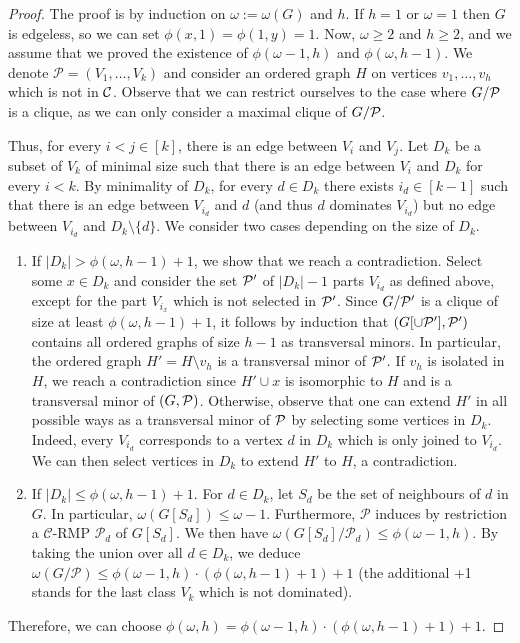 \documentclass[11pt]{article}
\numberwithin{equation}{section}
\begin{document}
\begin{proof}
    The proof is by induction on $\omega :=\omega(G)$ and $h$. 
    If $h=1$ or $\omega =1$ then $G$ is edgeless, so we can set $\phi(x,1)=\phi(1,y)=1$. 
    Now, $\omega \geq 2$ and $h \geq 2$, and we assume that we proved the existence of $\phi(\omega - 1, h)$ and $\phi(\omega, h-1)$.
    We denote $\mathcal{P} = (V_1, \ldots, V_k)$ and consider an ordered graph $H$ on vertices $v_1,\dots ,v_h$ which is not in $\cal C$. Observe that we can restrict ourselves to the case where $G/{\cal P}$ is a clique, as we can only consider a maximal clique of $G/{\cal P}$.
    
    Thus, for every $i < j \in [k]$, there is an edge between $V_i$ and $V_j$.
    Let $D_k$ be a subset of $V_k$ of minimal size such that there is an edge between $V_i$ and $D_k$ for every $i < k$. By minimality of $D_k$, for every $d \in D_k$ there exists $i_d \in [k-1]$ such that there is an edge between $V_{i_d}$ and $d$ (and thus $d$ dominates $V_{i_d}$) but no edge between $V_{i_d}$ and $D_k \setminus \{d\}$. We consider two cases depending on the size of $D_k$. 
    
    \begin{enumerate}
        \item If $|D_k| > \phi(\omega, h-1)+1$, we show that we reach a contradiction. Select some $x\in D_k$ and consider the set $\cal P '$ of $|D_k|-1$ parts $V_{i_d}$ as defined above, except for the part $V_{i_x}$ which is not selected in $\cal P '$. Since $G/\cal P'$ is a clique of size at least $\phi(\omega, h-1)+1$, it follows by induction that $(G[\cup {\cal P'}],\cal P')$ contains all ordered graphs of size $h-1$ as transversal minors. In particular, the ordered graph $H'=H\setminus v_h$ is a transversal minor of $\cal P '$.
        If $v_h$ is isolated in $H$, we reach a contradiction since $H'\cup x$ is isomorphic to $H$ and is a transversal minor of $(G,\cal P)$. Otherwise, observe that one can extend $H'$ in all possible ways as a transversal minor of $\cal P$ by selecting some vertices in $D_k$. Indeed, every $V_{i_d}$ corresponds to a vertex $d$ in $D_k$ which is only joined to $V_{i_d}$. We can then select vertices in $D_k$ to extend $H'$ to $H$, a contradiction.
        
        \item If $|D_k| \leq \phi(\omega, h-1)+1$. For $d \in D_k$, let $S_d$ be the set of neighbours of $d$ in $G$. In particular, $\omega(G[S_d]) \leq \omega - 1$. Furthermore, $\mathcal{P}$ induces by restriction a $\mathcal{C}$-RMP $\mathcal{P}_d$ of $G[S_d]$. We then have $\omega(G[S_d]/\mathcal{P}_d) \leq \phi(\omega - 1, h)$. By taking the union over all $d \in D_k$, we deduce $\omega(G/\mathcal{P}) \leq \phi(\omega - 1, h) \cdot (\phi(\omega, h-1) +1)+ 1$ (the additional +1 stands for the last class $V_k$ which is not dominated).
        
    
        
    \end{enumerate}

Therefore, we can choose $\phi(\omega, h) = \phi(\omega - 1, h) \cdot (\phi(\omega, h-1) +1)+ 1$.
\end{proof}
\end{document}
